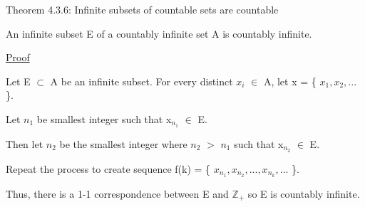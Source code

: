 { \color{red} Theorem 4.3.6: Infinite subsets of countable sets are countable } 

	\qquad An infinite subset E of a countably infinite set A is countably infinite.

{ \color{magenta} \underline{Proof} } 

	Let E $\subset$ A be an infinite subset.
	For every distinct $x_i$ $\in$ A, let x = \{ $x_1, x_2, ...$ \}.

	Let $n_1$ be smallest integer such that x$_{n_1}$ $\in$ E.

	Then let $n_2$ be the smallest integer where $n_2$ $>$ $n_1$ such that x$_{n_2}$ $\in$ E.

	Repeat the process to create sequence f(k) = \{ $x_{n_1}, x_{n_2}, ... , x_{n_k} , ...$ \}.

	Thus, there is a 1-1 correspondence between E and $\mathbb{Z}_+$ so
	E is countably infinite.







